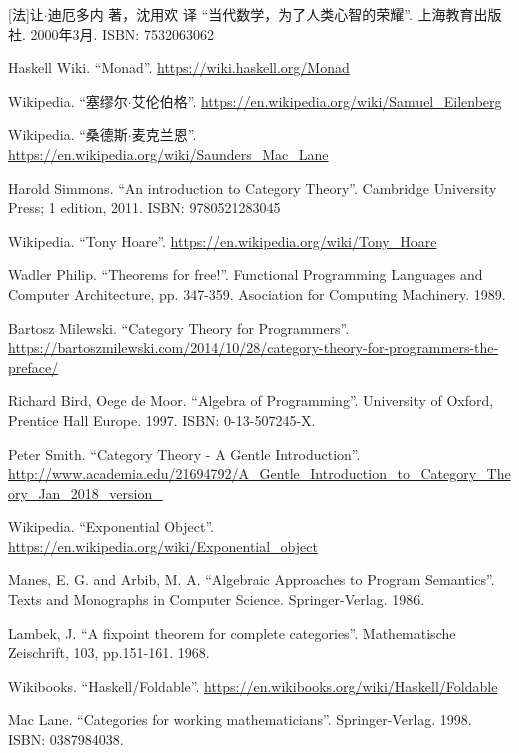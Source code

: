 \documentclass[b5paper]{ctexart}
\begin{document}
\begin{thebibliography}{99}

[法]让$\cdot$迪厄多内 著，沈用欢 译 ``当代数学，为了人类心智的荣耀''. 上海教育出版社. 2000年3月. ISBN: 7532063062

Haskell Wiki. ``Monad''. \url{https://wiki.haskell.org/Monad}

Wikipedia. ``塞缪尔$\cdot$艾伦伯格''. \url{https://en.wikipedia.org/wiki/Samuel_Eilenberg}

Wikipedia. ``桑德斯$\cdot$麦克兰恩''. \url{https://en.wikipedia.org/wiki/Saunders_Mac_Lane}

Harold Simmons. ``An introduction to Category Theory''.  Cambridge University Press; 1 edition, 2011. ISBN: 9780521283045

Wikipedia. ``Tony Hoare''. \url{https://en.wikipedia.org/wiki/Tony_Hoare}

Wadler Philip. ``Theorems for free!''. Functional Programming Languages and Computer Architecture, pp. 347-359. Asociation for Computing Machinery. 1989.

Bartosz Milewski. ``Category Theory for Programmers''. \url{https://bartoszmilewski.com/2014/10/28/category-theory-for-programmers-the-preface/}

Richard Bird, Oege de Moor. ``Algebra of Programming''. University of Oxford, Prentice Hall Europe. 1997. ISBN: 0-13-507245-X.

Peter Smith. ``Category Theory - A Gentle Introduction''. \url{http://www.academia.edu/21694792/A_Gentle_Introduction_to_Category_Theory_Jan_2018_version_}

Wikipedia. ``Exponential Object''. \url{https://en.wikipedia.org/wiki/Exponential_object}

Manes, E. G. and Arbib, M. A. ``Algebraic Approaches to Program Semantics''. Texts and Monographs in Computer Science. Springer-Verlag. 1986.

Lambek, J. ``A fixpoint theorem for complete categories''. Mathematische Zeischrift, 103, pp.151-161. 1968.

Wikibooks. ``Haskell/Foldable''.  \url{https://en.wikibooks.org/wiki/Haskell/Foldable}

Mac Lane. ``Categories for working mathematicians''. Springer-Verlag. 1998. ISBN: 0387984038.

\end{thebibliography}

\expandafter\enddocument

\fi
\end{document}

